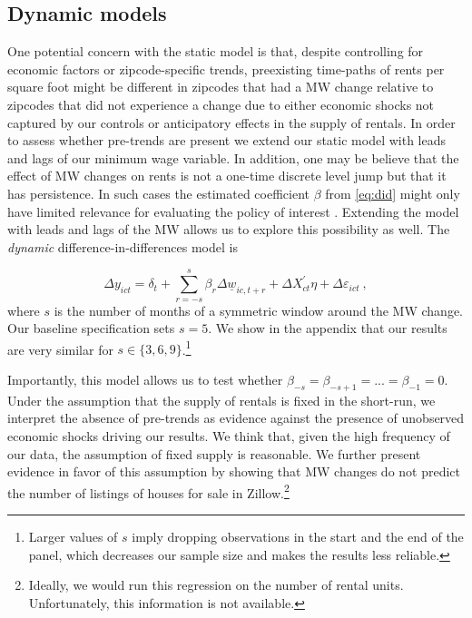 \subsection{Dynamic models}

One potential concern with the static model is that, despite controlling for economic 
factors or zipcode-specific trends, preexisting time-paths of rents per square foot might 
be different in zipcodes that had a MW change relative to zipcodes that did not experience 
a change due to either economic shocks not captured by our controls or anticipatory effects 
in the supply of rentals. In order to assess whether pre-trends are present we extend our 
static model with leads and lags of our minimum wage variable. In addition, one may be 
believe that the effect of MW changes on rents is not a one-time discrete level jump but 
that it has persistence. In such cases the estimated coefficient $\beta$ from \autoref{eq:did} 
might only have limited relevance for evaluating the policy of interest 
\parencite{callaway2019}. Extending the model with leads and lags of the MW allows us to 
explore this possibility as well. The \textit{dynamic} difference-in-differences model is

\begin{equation} \label{eq:leads_lags}
	\Delta y_{ict} = \delta_t
				  + \sum_{r=-s}^{s} \beta_r \Delta \underline{w}_{ic,t+r}
    			  +  \Delta X^{'}_{ct}\eta
    			  + \Delta \varepsilon_{ict} \ ,
\end{equation}
where $s$ is the number of months of a symmetric window around the MW change. Our baseline
specification sets $s = 5$. We show in the appendix that our results are very similar for
$s \in \{3, 6, 9\}$.\footnote{Larger values of $s$ imply dropping observations in the start 
	and the end of the panel, which decreases our sample size and makes the results less 
	reliable.}

Importantly, this model allows us to test whether $\beta_{-s} = \beta_{-s+1} = ... 
= \beta_{-1} = 0$. Under the assumption that the supply of rentals is fixed in the short-run, 
we interpret the absence of pre-trends as evidence against the presence of unobserved economic 
shocks driving our results. We think that, given the high frequency of our data, the 
assumption of fixed supply is reasonable. We further present evidence in favor of this 
assumption by showing that MW changes do not predict the number of listings of houses for sale 
in Zillow.\footnote{Ideally, we would run this regression on the number of rental units. 
	Unfortunately, this information is not available.}

